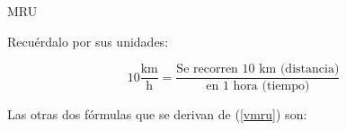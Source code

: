 \documentclass{beamer}
\begin{document}
\begin{frame}{MRU}
% 

Recu\'erdalo por sus unidades:


\begin{equation*}
10\frac{\text{km}}{\text{h}} =
\frac{\text{Se recorren 10 km ({distancia})}}
{\text{en 1 hora ({tiempo})}}
\end{equation*}
                                                               
 
Las otras dos f\'ormulas que se derivan de (\ref{vmru}) son:

{\large \xmru \ \tmru}
                                                              
\end{frame}
\end{document}
